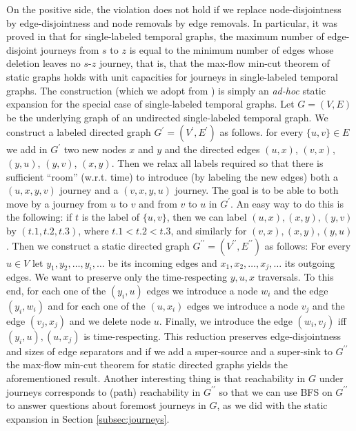 \documentclass[oribibl, 11pt]{llncs}
\newcommand{\dprime}{\prime\prime}
\begin{document}
On the positive side, the violation does not hold if we replace node-disjointness by edge-disjointness and node removals by edge removals. In particular, it was proved in \cite{Be96} that for single-labeled temporal graphs,  the maximum number of edge-disjoint journeys from $s$ to $z$ is equal to the minimum number of edges whose deletion leaves no $s$-$z$ journey, that is, that the max-flow min-cut theorem of static graphs holds with unit capacities for journeys in single-labeled temporal graphs. The construction (which we adopt from \cite{KKK00}) is simply an \emph{ad-hoc} static expansion for the special case of single-labeled temporal graphs. Let $G = (V,E)$ be the underlying graph of an undirected single-labeled temporal graph. We construct a labeled directed graph $G^{\prime} = (V^{\prime}, E^{\prime})$ as follows. for every $\{u, v\}\in E$ we add in $G^{\prime}$ two new nodes $x$ and $y$ and the directed edges $(u, x)$, $(v, x)$, $(y, u)$, $(y, v)$, $(x, y)$. Then we relax all labels required so that there is sufficient ``room'' (w.r.t. time) to introduce (by labeling the new edges) both a $(u,x,y,v)$ journey and a $(v,x,y,u)$ journey. The goal is to be able to both move by a journey from $u$ to $v$ and from $v$ to $u$ in $G^{\prime}$. An easy way to do this is the following: if $t$ is the label of $\{u, v\}$, then we can label $(u,x),(x,y),(y,v)$ by $(t.1,t.2,t.3)$, where $t.1<t.2<t.3$, and similarly for $(v,x),(x,y),(y,u)$. Then we construct a static directed graph $G^{\dprime} = (V^{\dprime}, E^{\dprime})$ as follows: For every $u\in V$ let $y_1,y_2,\ldots,y_i,\ldots$ be its incoming edges and $x_1, x_2,\ldots, x_j,\ldots$ its outgoing edges. We want to preserve only the time-respecting $y, u, x$ traversals. To this end, for each one of the $(y_i, u)$ edges we introduce a node $w_i$ and the edge $(y_i, w_i)$ and for each one of the $(u, x_i)$ edges we introduce a node $v_j$ and the edge $(v_j, x_j)$ and we delete node $u$. Finally, we introduce the edge $(w_i, v_j)$ iff $(y_i, u), (u, x_j)$ is time-respecting. This reduction preserves edge-disjointness and sizes of edge separators and if we add a super-source and a super-sink to $G^{\dprime}$ the max-flow min-cut theorem for static directed graphs yields the aforementioned result. Another interesting thing is that reachability in $G$ under journeys corresponds to (path) reachability in $G^{\dprime}$ so that we can use BFS on $G^{\dprime}$ to answer questions about foremost journeys in $G$, as we did with the static expansion in Section \ref{subsec:journeys}.
\end{document}
